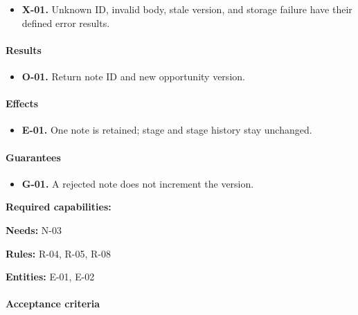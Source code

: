 \documentclass[10pt,a4paper]{article}
\begin{document}
\begin{itemize}

\item \textbf{X-01.} Unknown ID, invalid body, stale version, and storage failure have their defined error results.

\end{itemize}

\paragraph{Results}

\begin{itemize}

\item \textbf{O-01.} Return note ID and new opportunity version.

\end{itemize}

\paragraph{Effects}

\begin{itemize}

\item \textbf{E-01.} One note is retained; stage and stage history stay unchanged.

\end{itemize}

\paragraph{Guarantees}

\begin{itemize}

\item \textbf{G-01.} A rejected note does not increment the version.

\end{itemize}

\textbf{Required capabilities:} 

\textbf{Needs:} N-03

\textbf{Rules:} R-04, R-05, R-08

\textbf{Entities:} E-01, E-02

\paragraph{Acceptance criteria}
\end{document}
